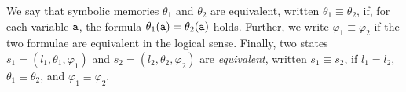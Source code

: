 \documentclass{sig-alternate}%
\newtheorem{dfn}{Definition}%
\newcommand{\var}[1]{{\tt #1}}
\newcommand{\ese}[1]{\ensuremath{\langle #1 \rangle}}
\newcommand{\compose}{\ensuremath{\diamond}}
\begin{document}


We say that symbolic memories $\theta_1$ and $\theta_2$ are equivalent,
written $\theta_1\equiv\theta_2$, if, for each variable $\var{a}$, the
formula $\theta_1(\var{a})=\theta_2(\var{a})$ holds. Further, we write
$\varphi_1\equiv\varphi_2$ if the two formulae are equivalent in the logical
sense. Finally, two states $s_1=(l_1,\theta_1,\varphi_1)$ and
$s_2=(l_2,\theta_2,\varphi_2)$ are \emph{equivalent}, written $s_1\equiv s_2$,
if $l_1=l_2$, $\theta_1\equiv\theta_2$, and $\varphi_1\equiv\varphi_2$.
\end{document}
